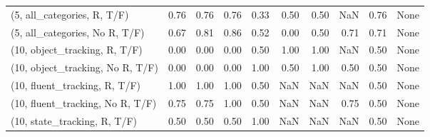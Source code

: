 \begin{table*}[h!]
\begin{adjustbox}{width=2\columnwidth,center}
\begin{tabular}{lrrr|rrr|rrr}
(5, all\_categories, R, T/F)          &                      0.76 &                  0.76 &                      0.76 &                          0.33 &                      0.50 &                          0.50 &                                    NaN &                               0.76 &                                  None \\
(5, all\_categories, No R, T/F)       &                      0.67 &                  0.81 &                      0.86 &                          0.52 &                      0.00 &                          0.50 &                                   0.71 &                               0.71 &                                  None \\



\midrule
(10, object\_tracking, R, T/F)         &                      0.00 &                  0.00 &                      0.00 &                          0.50 &                      1.00 &                          1.00 &                                    NaN &                               0.50 &                                  None \\
(10, object\_tracking, No R, T/F)      &                      0.00 &                  0.00 &                      0.00 &                          1.00 &                      0.50 &                          1.00 &                                   0.50 &                               0.50 &                                  None \\
(10, fluent\_tracking, R, T/F)         &                      1.00 &                  1.00 &                      1.00 &                          0.50 &                       NaN &                           NaN &                                    NaN &                               0.50 &                                  None \\
(10, fluent\_tracking, No R, T/F)      &                      0.75 &                  0.75 &                      1.00 &                          0.50 &                       NaN &                           NaN &                                   0.75 &                               0.50 &                                  None \\
(10, state\_tracking, R, T/F)          &                      0.50 &                  0.50 &                      0.50 &                          1.00 &                       NaN &                           NaN &                                    NaN &                               0.50 &                                  None \\

\end{tabular}
\end{adjustbox}
\end{table*}
